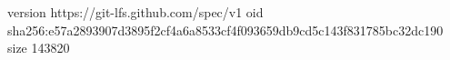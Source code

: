 version https://git-lfs.github.com/spec/v1
oid sha256:e57a2893907d3895f2cf4a6a8533cf4f093659db9cd5c143f831785bc32dc190
size 143820
